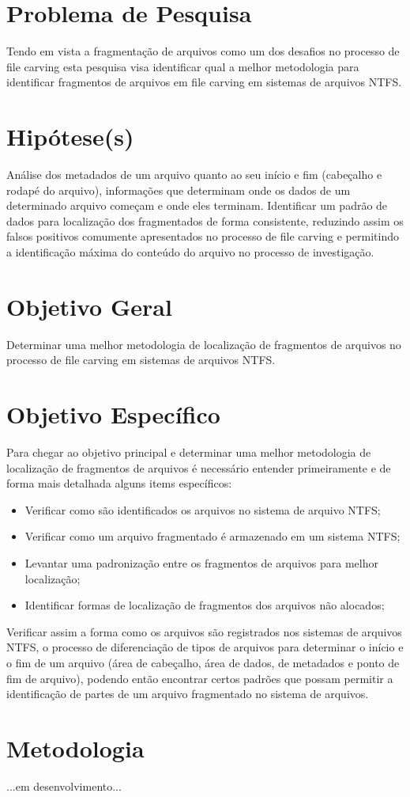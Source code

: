 \section{Problema de Pesquisa}
Tendo em vista a fragmentação de arquivos como um dos desafios no processo de file carving esta pesquisa visa identificar qual a melhor metodologia para identificar fragmentos de arquivos em file carving em sistemas de arquivos NTFS.

\section{Hipótese(s)}
Análise dos metadados de um arquivo quanto ao seu início e fim (cabeçalho e rodapé do arquivo), informações que determinam onde os dados de um determinado arquivo começam e onde eles terminam.
Identificar um padrão de dados para localização dos fragmentados de forma consistente, reduzindo assim os falsos positivos comumente apresentados no processo de file carving e permitindo a identificação máxima do conteúdo do arquivo no processo de investigação.

\section{Objetivo Geral}
Determinar uma melhor metodologia de localização de fragmentos de arquivos no processo de file carving em sistemas de arquivos NTFS.

\section{Objetivo Específico}
Para chegar ao objetivo principal e determinar uma melhor metodologia de localização de fragmentos de arquivos é necessário entender primeiramente e de forma mais detalhada alguns items específicos:

\begin{itemize}
 \item Verificar como são identificados os arquivos no sistema de arquivo NTFS;
 \item Verificar como um arquivo fragmentado é armazenado em um sistema NTFS;
 \item Levantar uma padronização entre os fragmentos de arquivos para melhor localização;
 \item Identificar formas de localização de fragmentos dos arquivos não alocados;
\end{itemize}

Verificar assim a forma como os arquivos são registrados nos sistemas de arquivos NTFS, o processo de diferenciação de tipos de arquivos para determinar o início e o fim de um arquivo (área de cabeçalho, área de dados, de metadados e ponto de fim de arquivo), podendo então encontrar certos padrões que possam permitir a identificação de partes de um arquivo fragmentado no sistema de arquivos.

\section{Metodologia}
...em desenvolvimento...